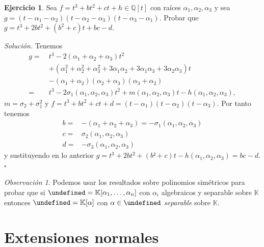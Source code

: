 \documentclass[10pt, spanish]{report}
\theoremstyle{definition}
\theoremstyle{custom}
\newtheorem*{ejer}{Ejercicio}
\newenvironment{sol}{\textit{Solución.}}{\hfill$\square$}
\theoremstyle{remark}
\newtheorem*{obs}{Observación}
\newcommand{\Q}{\mathbb{Q}}
\newcommand{\K}{\mathbb{K}}
\let\L\undefined
\newcommand{\L}{\mathbb{L}}
\begin{document}
\begin{ejer}
    Sea $f=t^3+bt^2+ct+h\in\Q[t]$ con raíces $\alpha_1, \alpha_2, \alpha_3$ y
    sea $g=(t-\alpha_1-\alpha_2)(t-\alpha_2-\alpha_3)(t-\alpha_3-\alpha_1)$.
    Probar que $g=t^3+2bt^2+(b^2+c)t+bc-d$.  
\end{ejer}
\begin{sol}
    Tenemos
    \begin{align*}
        g=\ &t^3-2(\alpha_1+\alpha_2+\alpha_3)t^2\\
          &+(\alpha_1^2+\alpha_2^2+\alpha_3^2+3\alpha_1\alpha_2+3\alpha_1\alpha_3+3\alpha_2\alpha_3)t\\
          &-(\alpha_1+\alpha_2)(\alpha_2+\alpha_3)(\alpha_3+\alpha_2)\\ 
         =\
          &t^3-2\sigma_1(\alpha_1,\alpha_2,\alpha_3)t^2+m(\alpha_1,\alpha_2,\alpha_3)t-h(\alpha_1,\alpha_2,\alpha_3),
    \end{align*}
    $m=\sigma_2+\sigma_1^2$ y  $f=t^3+bt^2+ct+d=(t-\alpha_1)(t-\alpha_2)(t-\alpha_3)$. Por tanto tenemos
    \begin{align*}
        b =& -(\alpha_1+\alpha_2+\alpha_3)=-\sigma_1(\alpha_1,\alpha_2,\alpha_3)\\
        c =& \sigma_2(\alpha_1,\alpha_2,\alpha_3)\\
        d =& -\sigma_3(\alpha_1,\alpha_2,\alpha_3)
    \end{align*}
    y sustituyendo en lo anterior
    $g=t^3+2bt^2+(b²+c)t-h(\alpha_1,\alpha_2,\alpha_3)=bc-d$.
\end{sol}

\begin{obs}
    Podemos usar los resultados sobre polinomios simétricos para probar que si
    $\L=\K[\alpha_1,\ldots,\alpha_n]$ con $\alpha_i$ algebraicos y separable
    sobre $\K$ entonces $\L=\K[\alpha]$ con $\alpha\in\L$ \textit{separable} sobre $\K$.     
\end{obs}

\section{Extensiones normales}
\end{document}
